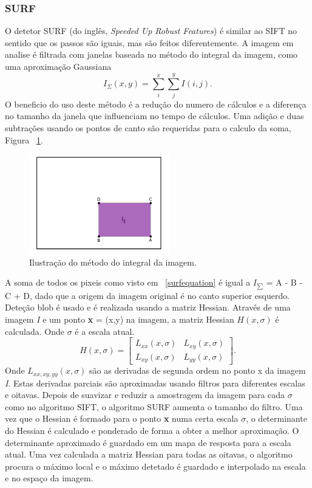 \subsubsection{SURF}

O detetor SURF (do inglês, \textit{Speeded Up Robust Features}) é similar ao SIFT no sentido que os passos são iguais, mas são feitos diferentemente. A imagem em analise é filtrada com janelas baseada no método do integral da imagem, como uma aproximação Gaussiana \begin{equation}\label{surfequation}
 I_{\Sigma}(x,y) = \sum_{i}^{x}\sum_{j}^{y}{I(i,j)}. \end{equation}
O beneficio do uso deste método é a redução do numero de cálculos e a diferença no tamanho da janela que influenciam no tempo de cálculos. Uma adição e duas subtrações usando os pontos de canto são requeridas para o calculo da soma, Figura ~\ref{fig:surfsqware}.

\begin{figure}[h!]
	\centering
	\includegraphics[width=0.4\linewidth]{figures/surfsqware}
	\caption{Ilustração do método do integral da imagem. \cite{VisualOdometryRodasVehicles}}
	\label{fig:surfsqware}
\end{figure}

A soma de todos os pixeis como visto em ~\ref{surfequation} é igual a \textit{$I_{\sum}$} = A - B - C + D, dado que a origem da imagem original é no canto superior esquerdo. Deteção blob é usado e é realizada usando a matriz Hessian. Através de uma imagem \textit{I} e um ponto \textbf{x} = (x,y) na imagem, a matriz Hessian $\textit{H}(x,\sigma)$ é calculada. Onde $\sigma$ é a escala atual. \[  \textit{H}(x,\sigma) = \left[ \begin{array}{cc}
L_{xx}(x,\sigma) & L_{xy}(x,\sigma) \\ 
L_{xy}(x,\sigma) & L_{yy}(x,\sigma)
\end{array} \right]. \] 
Onde $\textit{L}_{xx,xy,yy}(x,\sigma)$  são as derivadas de segunda ordem no ponto x da imagem \textit{I}. Estas derivadas parciais são aproximadas usando filtros para diferentes escalas e oitavas. Depois de suavizar e reduzir a amostragem da imagem para cada $\sigma$ como no algoritmo SIFT, o algoritmo SURF aumenta o tamanho do filtro. Uma vez que o Hessian é formado para o ponto \textbf{x} numa certa escala $\sigma$, o determinante do Hessian é calculado e ponderado de forma a obter a melhor aproximação.  O determinante aproximado é guardado em um mapa de resposta para a escala atual.
Uma vez calculada a matriz Hessian para todas as oitavas, o algoritmo procura o máximo local e o máximo detetado é guardado e interpolado na escala e no espaço da imagem. 

